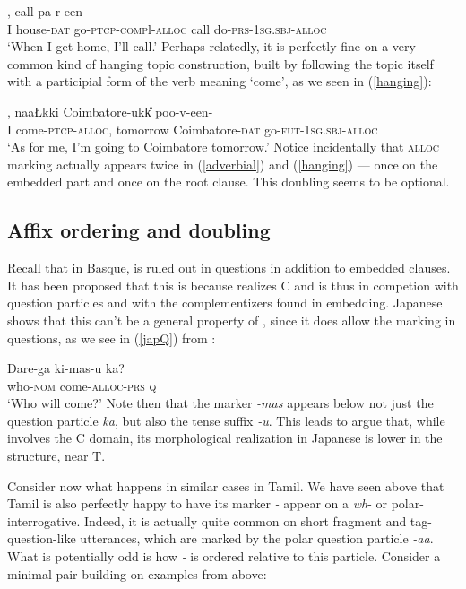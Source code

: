 \documentclass[output=paper, modfonts, nonflat]{langsci/langscibook}
\begin{document}
\ea\label{adverbial},
call pa\N\D-r-een-\nga\\ 
I house-\textsc{dat}{} go-\textsc{ptcp}-\textsc{comp}l-\textsc{alloc}{} call
do-\textsc{prs}-\textsc{1sg}.\textsc{sbj}-\textsc{alloc}\\ 
\glt `When I get home, I'll call.'
\z
%
Perhaps relatedly, it is perfectly fine on a very common kind of
hanging topic construction, built by following the topic itself with a
participial form of the verb meaning `come', as we seen in
(\ref{hanging}):

\ea\label{hanging}, naa\L\AI kki
Coimbatore-ukk\U{} poo-v-een-\nga\\
I come-\textsc{ptcp}-\textsc{alloc}, tomorrow Coimbatore-\textsc{dat}{}
go-\textsc{fut}-\textsc{1sg}.\textsc{sbj}-\textsc{alloc}\\ 
\glt `As for me, I'm going to Coimbatore tomorrow.'
\z
%
Notice incidentally that \textsc{alloc}{} marking actually appears twice in
(\ref{adverbial}) and (\ref{hanging}) --- once on the embedded part
and once on the root clause. This doubling seems to be optional. 


\subsection{Affix ordering and doubling}
\label{sec:orderdoub}


Recall that in Basque, \allagr{} is ruled out in questions in addition
to embedded clauses. It has been proposed that this is because
\allagr{} realizes C and is thus in competion with question particles
and with the complementizers found in embedding.  Japanese shows that
this can't be a general property of \allagr, since it does allow the
marking in questions, as we see in (\ref{japQ}) from
\citet{miyagawa:2017}:

\ea\label{japQ}\gll Dare-ga ki-mas-u ka?\\
who-\textsc{nom}{} come-\textsc{alloc}-\textsc{prs}{} \textsc{q}\\
\glt `Who will come?'
\z
%
Note then that the \allagr{} marker \textit{-mas} appears below not
just the question particle \textit{ka}, but also the tense suffix
\textit{-u}. This leads \citet{miyagawa:2017} to argue that, while
\allagr{} involves the C domain, its morphological realization in
Japanese is lower in the structure, near T.

Consider now what happens in similar cases in Tamil.  We have seen
above that Tamil is also perfectly happy to have its \allagr{} marker
\textit{-\nga} appear on a \textit{wh}- or polar-interrogative.
Indeed, it is actually quite common on short fragment and
tag-question-like utterances, which are marked by the polar question
particle \textit{-aa}.  What is potentially odd is how \textit{-\nga}
is ordered relative to this particle.  Consider a minimal pair
building on examples from above:
\end{document}
